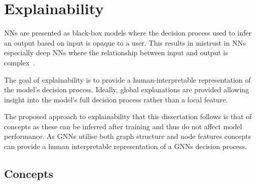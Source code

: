 

\section{Explainability}




NNs are presented as black-box models where the decision process used to infer an output based on input is opaque to a user.
This results in mistrust in NNs especially deep NNs where the relationship between input and output is complex~\cite{haibe2020transparency,wang2022revise}.

The goal of explainability is to provide a human-interpretable representation of the model's decision process.
Ideally, global explanations are provided allowing insight into the model's full decision process rather than a local feature.

The proposed approach to explainability that this dissertation follows is that of concepts as these can be inferred after training and thus do not affect model performance.
As GNNs utilise both graph structure and node features concepts can provide a human interpretable representation of a GNNs decision process.

\subsection{Concepts}



